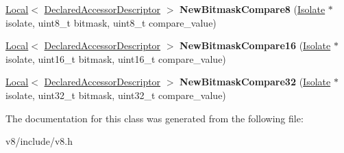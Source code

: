 \begin{DoxyCompactItemize}
\item 
\hypertarget{classv8_1_1RawOperationDescriptor_a02b9ebd9141b942ee5eaf844837b5a54}{}\hyperlink{classv8_1_1Local}{Local}$<$ \hyperlink{classv8_1_1DeclaredAccessorDescriptor}{Declared\+Accessor\+Descriptor} $>$ {\bfseries New\+Bitmask\+Compare8} (\hyperlink{classv8_1_1Isolate}{Isolate} $\ast$isolate, uint8\+\_\+t bitmask, uint8\+\_\+t compare\+\_\+value)\label{classv8_1_1RawOperationDescriptor_a02b9ebd9141b942ee5eaf844837b5a54}

\item 
\hypertarget{classv8_1_1RawOperationDescriptor_a36f50eb26b4e4fc689d3e77a3a60484d}{}\hyperlink{classv8_1_1Local}{Local}$<$ \hyperlink{classv8_1_1DeclaredAccessorDescriptor}{Declared\+Accessor\+Descriptor} $>$ {\bfseries New\+Bitmask\+Compare16} (\hyperlink{classv8_1_1Isolate}{Isolate} $\ast$isolate, uint16\+\_\+t bitmask, uint16\+\_\+t compare\+\_\+value)\label{classv8_1_1RawOperationDescriptor_a36f50eb26b4e4fc689d3e77a3a60484d}

\item 
\hypertarget{classv8_1_1RawOperationDescriptor_a4dc21ff1a6b8463c1c85db8362bb56a3}{}\hyperlink{classv8_1_1Local}{Local}$<$ \hyperlink{classv8_1_1DeclaredAccessorDescriptor}{Declared\+Accessor\+Descriptor} $>$ {\bfseries New\+Bitmask\+Compare32} (\hyperlink{classv8_1_1Isolate}{Isolate} $\ast$isolate, uint32\+\_\+t bitmask, uint32\+\_\+t compare\+\_\+value)\label{classv8_1_1RawOperationDescriptor_a4dc21ff1a6b8463c1c85db8362bb56a3}

\end{DoxyCompactItemize}


The documentation for this class was generated from the following file\+:\begin{DoxyCompactItemize}
\item 
v8/include/v8.\+h\end{DoxyCompactItemize}
